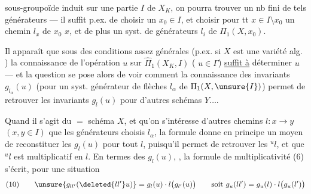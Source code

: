 sous-groupoïde induit sur une partie \uline{}  $I$ de $X_K$, on pourra trouver un nb fini de tels générateurs --- il suffit p.ex. de choisir un  $x_0\in I$, et choisir pour tt $x\in I\setminus x_0$ un chemin $l_x$ de $x_0$  $x$, et de plus un syst.  de générateurs $l_i$ de $\Pi_1(X,x_0)$.

Il apparaît que sous des conditions assez générales (p.ex. si $X$ est une variété alg. ) la connaissance de l'opération $u$ sur $\widehat{\Pi}_1(X_K,I)$ ( $u\in\Gamma$) \uline{suffit à} déterminer $u$ --- et la question se pose alors de voir comment la connaissance des invariants  $g_{l_\alpha}(u)$ (pour un syst. générateur de flèches $l_\alpha$ de $\Pi_1(X,\unsure{I})$) permet de retrouver les invariants $g_l(u)$ pour d'autres schémas $Y\ldots$.

Quand il s'agit du $=$ schéma $X$, et qu'on s'intéresse  d'autres chemins $l:x\longrightarrow y$ $(x,y\in I)$ que les générateurs choisis $l_\alpha$, la formule donne en principe un moyen de reconstituer les $g_l(u)$ pour tout $l$, puisqu'il permet de retrouver les ${}^u l$, et que ${}^u l$ est multiplicatif en $l$. En termes des $g_l(u)$, , la formule de multiplicativité (6) s'écrit, pour une situation
\[
(10)\qquad \unsure{g_{ll'}(\deleted{ll'}u)}=g_l(u)\cdot l\bigl(g_{l'}(u)\bigr)
\qquad\text{soit }g_u(ll')=g_u(l)\cdot l\bigl(g_u(l')\bigr)
\]
